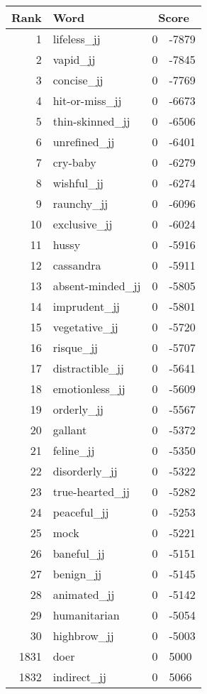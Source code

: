 \begin{longtable}[!htbp]{| rlr@{.}l |}
    \hline
    \textbf{Rank} & \textbf{Word} & \multicolumn{2}{c|}{\textbf{Score}} \\
    \hline
    \endhead
    1 & lifeless\_jj & 0 & -7879 \\
    2 & vapid\_jj & 0 & -7845 \\
    3 & concise\_jj & 0 & -7769 \\
    4 & hit-or-miss\_jj & 0 & -6673 \\
    5 & thin-skinned\_jj & 0 & -6506 \\
    6 & unrefined\_jj & 0 & -6401 \\
    7 & cry-baby & 0 & -6279 \\
    8 & wishful\_jj & 0 & -6274 \\
    9 & raunchy\_jj & 0 & -6096 \\
    10 & exclusive\_jj & 0 & -6024 \\
    11 & hussy & 0 & -5916 \\
    12 & cassandra & 0 & -5911 \\
    13 & absent-minded\_jj & 0 & -5805 \\
    14 & imprudent\_jj & 0 & -5801 \\
    15 & vegetative\_jj & 0 & -5720 \\
    16 & risque\_jj & 0 & -5707 \\
    17 & distractible\_jj & 0 & -5641 \\
    18 & emotionless\_jj & 0 & -5609 \\
    19 & orderly\_jj & 0 & -5567 \\
    20 & gallant & 0 & -5372 \\
    21 & feline\_jj & 0 & -5350 \\
    22 & disorderly\_jj & 0 & -5322 \\
    23 & true-hearted\_jj & 0 & -5282 \\
    24 & peaceful\_jj & 0 & -5253 \\
    25 & mock & 0 & -5221 \\
    26 & baneful\_jj & 0 & -5151 \\
    27 & benign\_jj & 0 & -5145 \\
    28 & animated\_jj & 0 & -5142 \\
    29 & humanitarian & 0 & -5054 \\
    30 & highbrow\_jj & 0 & -5003 \\
    1831 & doer & 0 & 5000 \\
    1832 & indirect\_jj & 0 & 5066 \\

\end{longtable}
